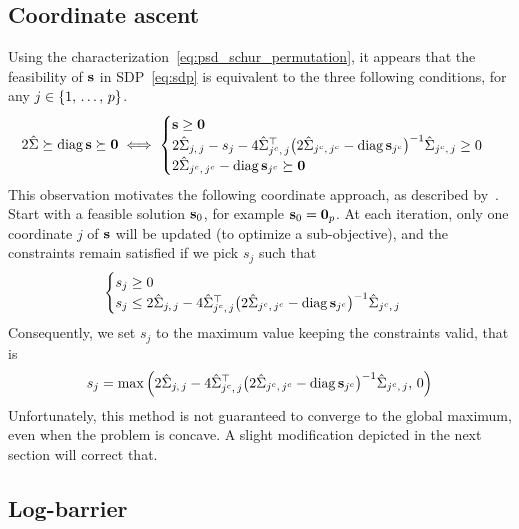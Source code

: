 \subsection{Coordinate ascent}\label{subsec:coordinate_ascent}

Using the characterization~\ref{eq:psd_schur_permutation},
it appears that the feasibility of $\mathbf{s}$ in SDP~\ref{eq:sdp} is equivalent to the three following conditions,
for any $j \in \left\{ 1,\, \dots,\, p \right\}$.
\begin{equation}\label{eq:schur_sdp_constraints}
    2\hat{\Sigma} \succeq \operatorname*{diag} \mathbf{s} \succeq \mathbf{0}
    \iff
    \begin{cases}
        \mathbf{s} \geq \mathbf{0}\\
        2\hat{\Sigma}_{j,\, j} - s_j
            - 4\hat{\Sigma}_{j^c,\, j}^\top\big( 2\hat{\Sigma}_{j^c,\, j^c} - \operatorname*{diag} \mathbf{s}_{j^c} \big)^{-1}\hat{\Sigma}_{j^c,\, j} \geq 0\\
        2\hat{\Sigma}_{j^c,\, j^c} - \operatorname*{diag} \mathbf{s}_{j^c} \succeq \mathbf{0}
    \end{cases}
\end{equation}
This observation motivates the following coordinate approach, as described by~\cite{block_coordinate_sdp}.
Start with a feasible solution $\mathbf{s}_0$, for example $\mathbf{s}_0 = \mathbf{0}_p$.
At each iteration, only one coordinate $j$ of $\mathbf{s}$ will be updated (to optimize a sub-objective),
and the constraints remain satisfied if we pick $s_j$ such that
\begin{equation}\label{eq:sdp_simple_constraints}
    \begin{cases}
        s_j \geq 0\\
        s_j \leq 2\hat{\Sigma}_{j,\, j}
            - 4\hat{\Sigma}_{j^c,\, j}^\top\big( 2\hat{\Sigma}_{j^c,\, j^c} - \operatorname*{diag} \mathbf{s}_{j^c} \big)^{-1}\hat{\Sigma}_{j^c,\, j}
    \end{cases}
\end{equation}
Consequently, we set $s_j$ to the maximum value keeping the constraints valid,
that is
\begin{equation*}
s_j = \max\Big( 2\hat{\Sigma}_{j,\, j}
    - 4\hat{\Sigma}_{j^c,\, j}^\top\big( 2\hat{\Sigma}_{j^c,\, j^c} - \operatorname*{diag} \mathbf{s}_{j^c} \big)^{-1}\hat{\Sigma}_{j^c,\, j}
    ,\, 0 \Big)
\end{equation*}
Unfortunately, this method is not guaranteed to converge to the global maximum, even when the problem is concave.
A slight modification depicted in the next section will correct that.

\subsection{Log-barrier}\label{subsec:log_barrier}

